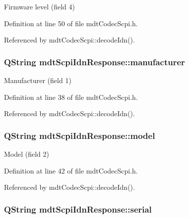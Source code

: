 Firmware level (field 4) 



Definition at line 50 of file mdt\-Codec\-Scpi.\-h.



Referenced by mdt\-Codec\-Scpi\-::decode\-Idn().

\hypertarget{structmdt_scpi_idn_response_a0717970554dda1af9280da1631a3780c}{
\subsubsection[{manufacturer}]{\setlength{\rightskip}{0pt plus 5cm}Q\-String mdt\-Scpi\-Idn\-Response\-::manufacturer}}\label{structmdt_scpi_idn_response_a0717970554dda1af9280da1631a3780c}


Manufacturer (field 1) 



Definition at line 38 of file mdt\-Codec\-Scpi.\-h.



Referenced by mdt\-Codec\-Scpi\-::decode\-Idn().

\hypertarget{structmdt_scpi_idn_response_a74342b6921035df5c97bebce6d3da4f8}{
\subsubsection[{model}]{\setlength{\rightskip}{0pt plus 5cm}Q\-String mdt\-Scpi\-Idn\-Response\-::model}}\label{structmdt_scpi_idn_response_a74342b6921035df5c97bebce6d3da4f8}


Model (field 2) 



Definition at line 42 of file mdt\-Codec\-Scpi.\-h.



Referenced by mdt\-Codec\-Scpi\-::decode\-Idn().

\hypertarget{structmdt_scpi_idn_response_a56f1955c1e339298793d0292f0f0a06c}{
\subsubsection[{serial}]{\setlength{\rightskip}{0pt plus 5cm}Q\-String mdt\-Scpi\-Idn\-Response\-::serial}}\label{structmdt_scpi_idn_response_a56f1955c1e339298793d0292f0f0a06c}


